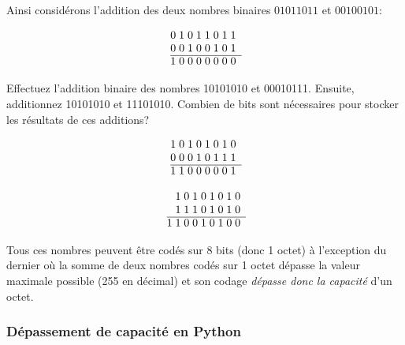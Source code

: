 \documentclass[12pt]{article}
\begin{document}
	Ainsi considérons l'addition des deux nombres binaires \(01011011\) et \(00100101\):
	 
	 \[
	 \begin{array}{@{}r *{8}{@{\;}c}}
	 	& 0 & 1 & 0 & 1 & 1 & 0 & 1 & 1 \\
	 	& 0 & 0 & 1 & 0 & 0 & 1 & 0 & 1 \\
	 	\cline{2-9}
	 	& 1 & 0 & 0 & 0 & 0 & 0 & 0 & 0 \\
	 \end{array}
	 \]
	 
	  \begin{MonExo}
	 	Effectuez l'addition binaire des nombres 10101010 et 00010111. Ensuite, additionnez 10101010 et 11101010. Combien de bits sont nécessaires pour stocker les résultats de ces additions?
	 \end{MonExo}
	 \begin{MaReponse}
	 	\begin{minipage}{0.45\textwidth}
	 		\[
	 		\begin{array}{@{}r *{8}{@{\;}c}}
	 			& 1 & 0 & 1 & 0 & 1 & 0 & 1 & 0 \\
	 			& 0 & 0 & 0 & 1 & 0 & 1 & 1 & 1 \\
	 			\cline{2-9}
	 			& 1 & 1 & 0 & 0 & 0 & 0 & 0 & 1 \\
	 		\end{array}
	 		\]
	 	\end{minipage}\hfill
	 	\begin{minipage}{0.45\textwidth}
	 		\[
	 		\begin{array}{@{}r *{9}{@{\;}c}}
	 			&& 1 & 0 & 1 & 0 & 1 & 0 & 1 & 0 \\
	 			&& 1 & 1 & 1 & 0 & 1 & 0 & 1 & 0 \\
	 			\cline{2-10}
	 			& 1 & 1 & 0 & 0 & 1 & 0 & 1 & 0 & 0 \\
	 		\end{array}
	 		\]
	 	\end{minipage}
	 	
	 	Tous ces nombres peuvent être codés sur 8 bits (donc 1 octet) à l'exception du dernier où la somme de deux nombres codés sur 1 octet dépasse la valeur maximale possible (255 en décimal) et son codage \emph{dépasse donc la capacité} d'un octet.
	 \end{MaReponse}

	\subsubsection*{Dépassement de capacité en Python}
	
\end{document}
